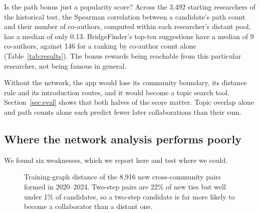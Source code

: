\documentclass[sigconf,nonacm]{acmart}
\begin{document}
Is the path bonus just a popularity score? Across the 3,492 starting researchers of the historical test, the Spearman correlation between a candidate's path count and their number of co-authors, computed within each researcher's distant pool, has a median of only 0.13. BridgeFinder's top-ten suggestions have a median of 9 co-authors, against 146 for a ranking by co-author count alone (Table~\ref{tab:results}). The bonus rewards being reachable from this particular researcher, not being famous in general.

Without the network, the app would lose its community boundary, its distance rule and its introduction routes, and it would become a topic search tool. Section~\ref{sec:eval} shows that both halves of the score matter. Topic overlap alone and path counts alone each predict fewer later collaborations than their sum.

\subsection{Where the network analysis performs poorly}\label{sec:poorly}
We found six weaknesses, which we report here and test where we could.

\begin{figure}[t]
\centering
{}
\caption{Training-graph distance of the 8,916 new cross-community pairs formed in 2020--2024. Two-step pairs are 22\% of new ties but well under 1\% of candidates, so a two-step candidate is far more likely to become a collaborator than a distant one.}
\label{fig:distance}
\end{figure}
\end{document}
